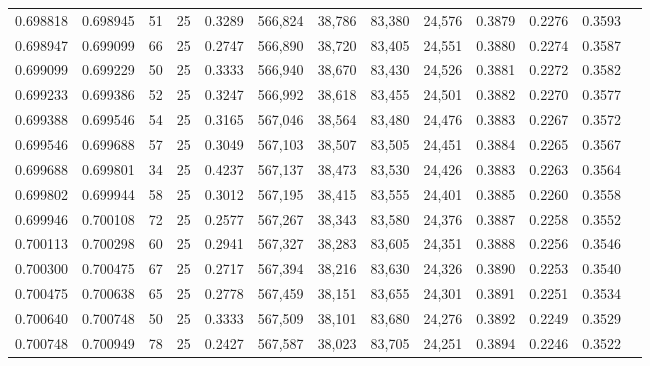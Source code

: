 \begin{tabular}{rrrrrrrrrrrrr}
0.698818 & 0.698945 &    51 &  25 &                                     0.3289 & 566,824 &  38,786 &  83,380 &  24,576 & 0.3879 & 0.2276 & 0.3593 \\
0.698947 & 0.699099 &    66 &  25 &                                     0.2747 & 566,890 &  38,720 &  83,405 &  24,551 & 0.3880 & 0.2274 & 0.3587 \\
0.699099 & 0.699229 &    50 &  25 &                                     0.3333 & 566,940 &  38,670 &  83,430 &  24,526 & 0.3881 & 0.2272 & 0.3582 \\
0.699233 & 0.699386 &    52 &  25 &                                     0.3247 & 566,992 &  38,618 &  83,455 &  24,501 & 0.3882 & 0.2270 & 0.3577 \\
0.699388 & 0.699546 &    54 &  25 &                                     0.3165 & 567,046 &  38,564 &  83,480 &  24,476 & 0.3883 & 0.2267 & 0.3572 \\
0.699546 & 0.699688 &    57 &  25 &                                     0.3049 & 567,103 &  38,507 &  83,505 &  24,451 & 0.3884 & 0.2265 & 0.3567 \\
0.699688 & 0.699801 &    34 &  25 &                                     0.4237 & 567,137 &  38,473 &  83,530 &  24,426 & 0.3883 & 0.2263 & 0.3564 \\
0.699802 & 0.699944 &    58 &  25 &                                     0.3012 & 567,195 &  38,415 &  83,555 &  24,401 & 0.3885 & 0.2260 & 0.3558 \\
0.699946 & 0.700108 &    72 &  25 &                                     0.2577 & 567,267 &  38,343 &  83,580 &  24,376 & 0.3887 & 0.2258 & 0.3552 \\
0.700113 & 0.700298 &    60 &  25 &                                     0.2941 & 567,327 &  38,283 &  83,605 &  24,351 & 0.3888 & 0.2256 & 0.3546 \\
0.700300 & 0.700475 &    67 &  25 &                                     0.2717 & 567,394 &  38,216 &  83,630 &  24,326 & 0.3890 & 0.2253 & 0.3540 \\
0.700475 & 0.700638 &    65 &  25 &                                     0.2778 & 567,459 &  38,151 &  83,655 &  24,301 & 0.3891 & 0.2251 & 0.3534 \\
0.700640 & 0.700748 &    50 &  25 &                                     0.3333 & 567,509 &  38,101 &  83,680 &  24,276 & 0.3892 & 0.2249 & 0.3529 \\
0.700748 & 0.700949 &    78 &  25 &                                     0.2427 & 567,587 &  38,023 &  83,705 &  24,251 & 0.3894 & 0.2246 & 0.3522 \\

\end{tabular}

